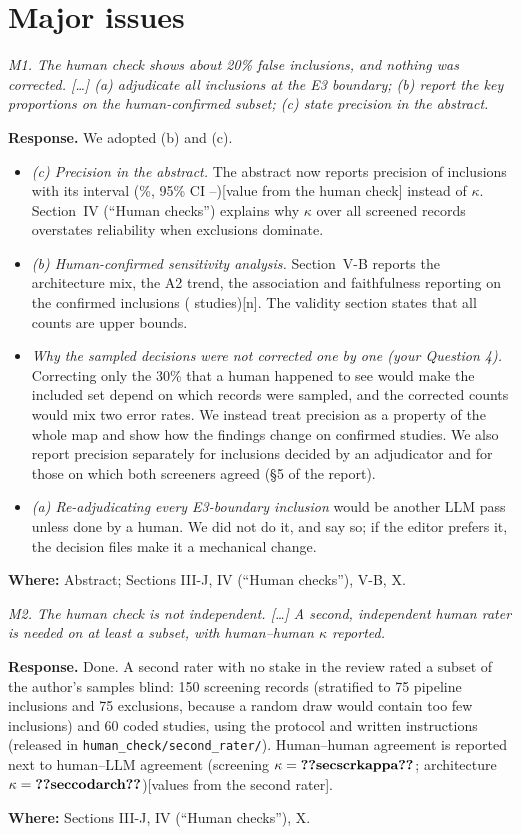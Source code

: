 \documentclass[10pt,a4paper]{article}
\newenvironment{referee}{\par\medskip\noindent\begin{minipage}{\linewidth}\color{black!65}\itshape}{\end{minipage}\par\smallskip}
\newcommand{\resp}{\noindent\textbf{Response.} }
\newcommand{\where}[1]{\par\noindent\textbf{Where:} #1\par}
\newcommand{\pending}[1]{\textcolor{red!70!black}{[#1]}}
\begin{document}
\section*{Major issues}

\begin{referee}M1. The human check shows about 20\% false inclusions, and nothing was corrected. [\ldots] (a) adjudicate all inclusions at the E3 boundary; (b) report the key proportions on the human-confirmed subset; (c) state precision in the abstract.\end{referee}
\resp We adopted (b) and (c).
\begin{itemize}
  \item \emph{(c) Precision in the abstract.} The abstract now reports precision of inclusions with its interval \ifhumancheck(\%, 95\% CI --)\else\pending{value from the human check}\fi{} instead of $\kappa$. Section~IV (``Human checks'') explains why $\kappa$ over all screened records overstates reliability when exclusions dominate.
  \item \emph{(b) Human-confirmed sensitivity analysis.} Section~V-B reports the architecture mix, the A2 trend, the association and faithfulness reporting on the confirmed inclusions \ifhumancheck( studies)\else\pending{n}\fi. The validity section states that all counts are upper bounds.
  \item \emph{Why the sampled decisions were not corrected one by one (your Question 4).} Correcting only the 30\% that a human happened to see would make the included set depend on which records were sampled, and the corrected counts would mix two error rates. We instead treat precision as a property of the whole map and show how the findings change on confirmed studies. We also report precision separately for inclusions decided by an adjudicator and for those on which both screeners agreed (\S5 of the report).
  \item \emph{(a) Re-adjudicating every E3-boundary inclusion} would be another LLM pass unless done by a human. We did not do it, and say so; if the editor prefers it, the decision files make it a mechanical change.
\end{itemize}
\where{Abstract; Sections III-J, IV (``Human checks''), V-B, X.}

\begin{referee}M2. The human check is not independent. [\ldots] A second, independent human rater is needed on at least a subset, with human--human $\kappa$ reported.\end{referee}
\resp Done. A second rater with no stake in the review rated a subset of the author's samples blind: 150 screening records (stratified to 75 pipeline inclusions and 75 exclusions, because a random draw would contain too few inclusions) and 60 coded studies, using the protocol and written instructions (released in \texttt{human\_check/second\_rater/}). Human--human agreement is reported next to human--LLM agreement \ifsecondrater(screening $\kappa=\cnt{secscrkappa}$; architecture $\kappa=\cnt{seccodarch}$)\else\pending{values from the second rater}\fi.
\where{Sections III-J, IV (``Human checks''), X.}
\end{document}

